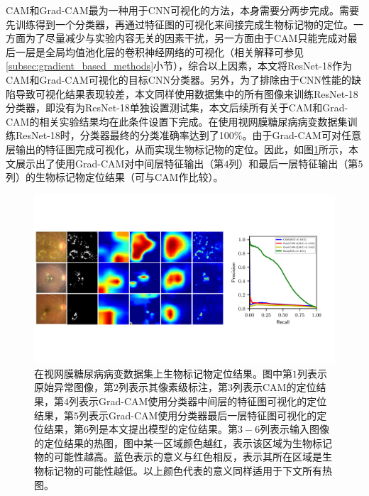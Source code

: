 CAM和Grad-CAM最为一种用于CNN可视化的方法，本身需要分两步完成。需要先训练得到一个分类器，再通过特征图的可视化来间接完成生物标记物的定位。一方面为了尽量减少与实验内容无关的因素干扰，另一方面由于CAM只能完成对最后一层是全局均值池化层的卷积神经网络的可视化（相关解释可参见\ref{subsec:gradient_based_methods}小节），综合以上因素，本文将ResNet-18作为CAM和Grad-CAM可视化的目标CNN分类器。另外，为了排除由于CNN性能的缺陷导致可视化结果表现较差，本文同样使用数据集中的所有图像来训练ResNet-18分类器，即没有为ResNet-18单独设置测试集，本文后续所有关于CAM和Grad-CAM的相关实验结果均在此条件设置下完成。在使用视网膜糖尿病病变数据集训练ResNet-18时，分类器最终的分类准确率达到了100\%。由于Grad-CAM可对任意层输出的特征图完成可视化，从而实现生物标记物的定位。因此，如图\ref{fig:retinal_image_res}所示，本文展示出了使用Grad-CAM对中间层特征输出（第$4$列）和最后一层特征输出（第$5$列）的生物标记物定位结果（可与CAM作比较）。
\begin{figure}[h]
	\centering
	\includegraphics[width=1.0\textwidth]{figure/retinal_image_res.pdf}
	\caption{在视网膜糖尿病病变数据集上生物标记物定位结果。图中第$1$列表示原始异常图像，第$2$列表示其像素级标注，第$3$列表示CAM的定位结果，第$4$列表示Grad-CAM使用分类器中间层的特征图可视化的定位结果，第$5$列表示Grad-CAM使用分类器最后一层特征图可视化的定位结果，第$6$列是本文提出模型的定位结果。第$3-6$列表示输入图像的定位结果的热图，图中某一区域颜色越红，表示该区域为生物标记物的可能性越高。蓝色表示的意义与红色相反，表示其所在区域是生物标记物的可能性越低。以上颜色代表的意义同样适用于下文所有热图。}
	\label{fig:retinal_image_res}
\end{figure}

